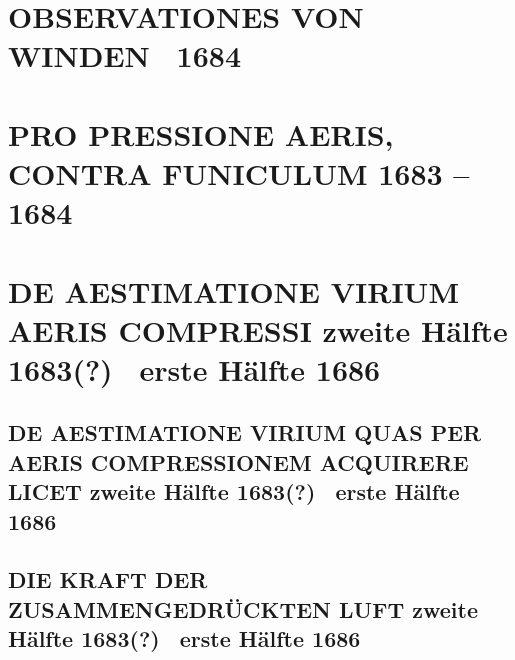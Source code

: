\documentclass[%
fontsize=10pt,
]{scrbook}
\DeclareRobustCommand{\bracks}[1]{%
\textup{\lbrack}#1\textup{\rbrack}}
\begin{document}
\chapter[tocentry={Observationes von Winden
\enskip \lbrack1683 \textendash\ 1684\rbrack},
head={Observationes von Winden}]%
{\MakeUppercase{Observationes von Winden}
\newline {} \textendash\ 1684\rbrack}
\label{60258}





\chapter[tocentry={Pro pressione aeris, contra funiculum
\enskip \bracks{1683 -- 1684}},
head={Pro pressione aeris, contra funiculum}]%
{\MakeUppercase{Pro pressione aeris, contra funiculum}
\newline \bracks{1683 -- 1684}}
\label{60206}




\chapter[tocentry={De aestimatione virium aeris compressi %
\enskip%
\bracks{%
zweite Hälfte 1683\;(?)
\textendash\
erste Hälfte
1686}},
head={De aestimatione virium aeris compressi}]%
{\MakeUppercase{De aestimatione virium aeris compressi}
\newline%
\bracks{%
zweite Hälfte 1683\;(?)
\textendash\
erste Hälfte
1686}}
\label{aestimavirium_intro}



\section[tocentry={De aestimatione virium quas per aeris compressionem acquirere licet
\enskip%
\bracks{%
zweite Hälfte 1683\;(?)
\textendash\
erste Hälfte
1686}},
head={De aestimatione virium}]%
{\MakeUppercase{De aestimatione virium quas per aeris compressionem acquirere licet}
\newline%
\bracks{%
zweite Hälfte 1683\;(?)
\textendash\
erste Hälfte
1686}}
\label{41212}



\section[tocentry={Die Kraft der zusammengedrückten Luft
\enskip%
\bracks{%
zweite Hälfte 1683\;(?)
\textendash\
erste Hälfte
1686%
}},
head={Die Kraft der zusammengedrückten Luft}]%
{\MakeUppercase{Die Kraft der zusammengedrückten Luft}
\newline%
\bracks{%
zweite Hälfte 1683\;(?)
\textendash\
erste Hälfte
1686%
}}
\label{41213}

\end{document}
